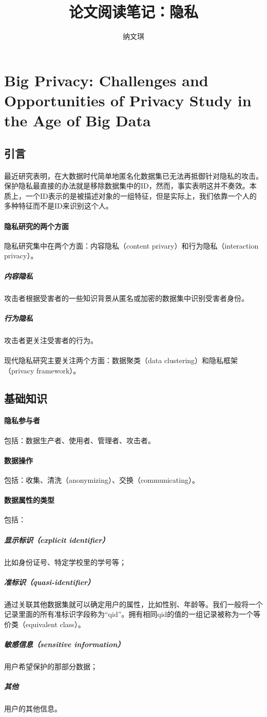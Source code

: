\documentclass[12pt,a4paper]{article}
\begin{document}

\title{论文阅读笔记：隐私}
\author{纳文琪}
\maketitle


\section{Big Privacy: Challenges and Opportunities of Privacy Study in the Age of Big Data\cite{yu2016big}}

\subsection{引言}
\paragraph{} 最近研究表明，在大数据时代简单地匿名化数据集已无法再抵御针对隐私的攻击。保护隐私最直接的办法就是移除数据集中的ID，然而，事实表明这并不奏效。本质上，一个ID表示的是被描述对象的一组特征，但是实际上，我们依靠一个人的多种特征而不是ID来识别这个人。
\paragraph{隐私研究的两个方面} 隐私研究集中在两个方面：内容隐私（content privary）和行为隐私（interaction privacy）。
	\subparagraph{内容隐私} 攻击者根据受害者的一些知识背景从匿名或加密的数据集中识别受害者身份。
	\subparagraph{行为隐私} 攻击者更关注受害者的行为。
\paragraph{} 现代隐私研究主要关注两个方面：数据聚类（data clustering）和隐私框架（privacy framework）。


\subsection{基础知识}
\paragraph{隐私参与者} 包括：数据生产者、使用者、管理者、攻击者。
\paragraph{数据操作} 包括：收集、清洗（anonymizing）、交换（communicating）。
\paragraph{数据属性的类型} 包括：
	\subparagraph{显示标识（explicit identifier）} 比如身份证号、特定学校里的学号等；
	\subparagraph{准标识（quasi-identifier）} 通过关联其他数据集就可以确定用户的属性，比如性别、年龄等。我们一般将一个记录里面的所有准标识字段称为“qid”。拥有相同qid的值的一组记录被称为一个等价类（equivalent class）。
	\subparagraph{敏感信息（sensitive information）} 用户希望保护的那部分数据；
	\subparagraph{其他} 用户的其他信息。
\end{document}
